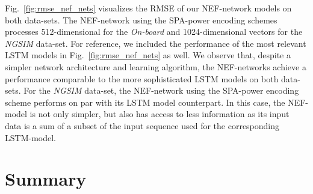 Fig.~\ref{fig:rmse_nef_nets} visualizes the \ac{RMSE} of our \ac{NEF}-network models on both data-sets.
The \ac{NEF}-network using the \ac{SPA}-power encoding schemes processes \num{512}-dimensional  for the \emph{On-board} and \num{1024}-dimensional vectors for the \emph{\ac{NGSIM}} data-set.
For reference, we included the performance of the most relevant \ac{LSTM} models in Fig.~\ref{fig:rmse_nef_nets} as well.
We observe that, despite a simpler network architecture and learning algorithm, the \ac{NEF}-networks achieve a performance comparable to the more sophisticated \ac{LSTM} models on both data-sets.
For the \emph{\ac{NGSIM}} data-set, the \ac{NEF}-network using the \ac{SPA}-power encoding scheme performs on par with its \ac{LSTM} model counterpart.
In this case, the \ac{NEF}-model is not only simpler, but also has access to less information as its input data is a sum of a subset of the input sequence used for the corresponding \ac{LSTM}-model.

\section{Summary}
